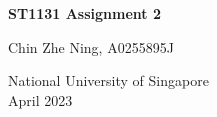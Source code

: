 \begin{titlepage}
    \begin{center}
        \vspace*{1cm}
            
        \Huge
        \textbf{ ST1131 Assignment 2}
            
        \vspace{0.5cm}
            
        \vspace{1.5cm}

        \LARGE
        Chin Zhe Ning, A0255895J
            
        \vfill
            
        \Large
        National University of Singapore\\
        April 2023
            
    \end{center}
\end{titlepage}